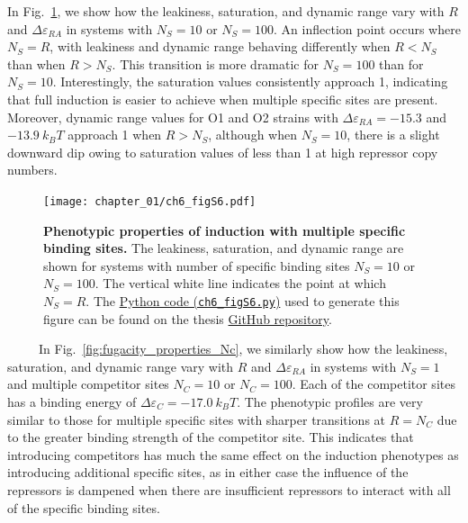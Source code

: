 \documentclass[12pt]{caltech_thesis}
\begin{document}
In Fig.~\ref{fig:fugacity_properties_Ns}, we show how the leakiness,
saturation, and dynamic range vary with \(R\) and
\(\Delta \varepsilon_{RA}\) in systems with \(N_S =10\) or
\(N_S = 100\). An inflection point occurs where \(N_S = R\), with
leakiness and dynamic range behaving differently when \(R < N_S\) than
when \(R > N_S\). This transition is more dramatic for \(N_S = 100\)
than for \(N_S = 10\). Interestingly, the saturation values consistently
approach 1, indicating that full induction is easier to achieve when
multiple specific sites are present. Moreover, dynamic range values for
O1 and O2 strains with \(\Delta \varepsilon_{RA} = -15.3\) and
\(-13.9~k_B T\) approach 1 when \(R > N_S\), although when \(N_S = 10\),
there is a slight downward dip owing to saturation values of less than 1
at high repressor copy numbers.

\hypertarget{fig:fugacity_properties_Ns}{%
\begin{figure}
\centering
\texttt{[image: chapter\_01/ch6\_figS6.pdf]}
\caption[{Phenotypic properties of induction with multiple specific
binding sites.}]{\textbf{Phenotypic properties of induction with
multiple specific binding sites.} The leakiness, saturation, and dynamic
range are shown for systems with number of specific binding sites
\(N_S = 10\) or \(N_S = 100\). The vertical white line indicates the
point at which \(N_S = R\). The
\href{https://github.com/gchure/phd/blob/master/src/chapter_06/code/ch6_figS6.py}{Python
code (\texttt{ch6\_figS6.py})} used to generate this figure can be found
on the thesis \href{https://github.com/gchure/phd}{GitHub repository}.}
\label{fig:fugacity_properties_Ns}
\end{figure}
}

~~~~~In Fig.~\ref{fig:fugacity_properties_Nc}, we similarly show how the
leakiness, saturation, and dynamic range vary with \(R\) and
\(\Delta \varepsilon_{RA}\) in systems with \(N_S =1\) and multiple
competitor sites \(N_C = 10\) or \(N_C = 100\). Each of the competitor
sites has a binding energy of \(\Delta \varepsilon_C = -17.0~k_BT\). The
phenotypic profiles are very similar to those for multiple specific
sites with sharper transitions at \(R = N_C\) due to the greater binding
strength of the competitor site. This indicates that introducing
competitors has much the same effect on the induction phenotypes as
introducing additional specific sites, as in either case the influence
of the repressors is dampened when there are insufficient repressors to
interact with all of the specific binding sites.
\end{document}
